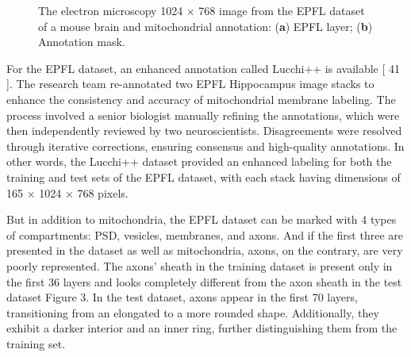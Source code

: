 \documentclass[journal,article,submit,pdftex,moreauthors]{Definitions/mdpi}
\begin{document}
\begin{figure}[H]
	\hspace{0.2cm}
	\caption{The electron microscopy 1024 × 768 image from the EPFL dataset of a mouse brain and mitochondrial annotation: (\textbf{a}) EPFL layer; (\textbf{b}) Annotation mask.\label{fig2}}
\end{figure}

For the EPFL dataset, an enhanced annotation called Lucchi++ is available [ 41 ]. The research team re-annotated two EPFL Hippocampus image stacks to enhance the consistency and accuracy of mitochondrial membrane labeling. The process involved a senior biologist manually refining the annotations, which were then independently reviewed by two neuroscientists. Disagreements were resolved through iterative corrections, ensuring consensus and high-quality annotations. In other words, the Lucchi++ dataset provided an enhanced labeling for both the training and test sets of the EPFL dataset, with each stack having dimensions of 165 × 1024 × 768 pixels.

But in addition to mitochondria, the EPFL dataset can be marked with 4 types of compartments: PSD, vesicles, membranes, and axons. And if the first three are presented in the dataset as well as mitochondria, axons, on the contrary, are very poorly represented. The axons’ sheath in the training dataset is present only in the first 36 layers and looks completely different from the axon sheath in the test dataset Figure 3. In the test dataset, axons appear in the first 70 layers, transitioning from an elongated to a more rounded shape. Additionally, they exhibit a darker interior and an inner ring, further distinguishing them from the training set.
\end{document}
